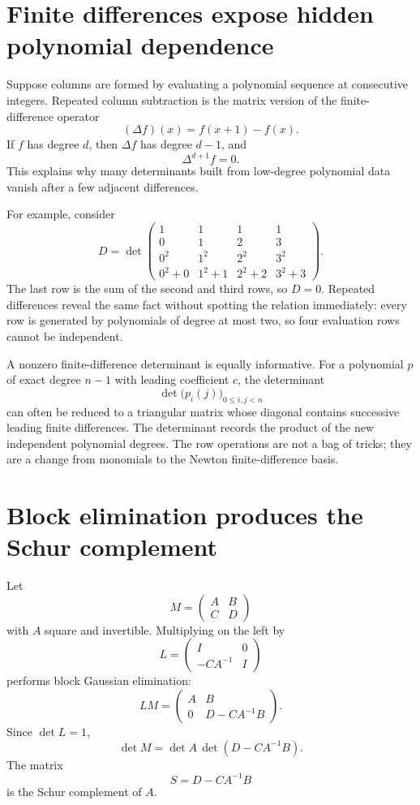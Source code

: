\section{Finite differences expose hidden polynomial dependence}

Suppose columns are formed by evaluating a polynomial sequence at consecutive integers.  Repeated column subtraction is the matrix version of the finite-difference operator
\[
  (\Delta f)(x)=f(x+1)-f(x).
\]
If \(f\) has degree \(d\), then \(\Delta f\) has degree \(d-1\), and
\[
  \Delta^{d+1}f=0.
\]
This explains why many determinants built from low-degree polynomial data vanish after a few adjacent differences.

For example, consider
\[
  D=
  \det
  \begin{pmatrix}
    1&1&1&1\\
    0&1&2&3\\
    0^2&1^2&2^2&3^2\\
    0^2+0&1^2+1&2^2+2&3^2+3
  \end{pmatrix}.
\]
The last row is the sum of the second and third rows, so \(D=0\).  Repeated differences reveal the same fact without spotting the relation immediately: every row is generated by polynomials of degree at most two, so four evaluation rows cannot be independent.

A nonzero finite-difference determinant is equally informative.  For a polynomial \(p\) of exact degree \(n-1\) with leading coefficient \(c\), the determinant
\[
  \det\bigl(p_i(j)\bigr)_{0\le i,j<n}
\]
can often be reduced to a triangular matrix whose diagonal contains successive leading finite differences.  The determinant records the product of the new independent polynomial degrees.  The row operations are not a bag of tricks; they are a change from monomials to the Newton finite-difference basis.

\section{Block elimination produces the Schur complement}

Let
\[
  M=
  \begin{pmatrix}
    A&B\\
    C&D
  \end{pmatrix}
\]
with \(A\) square and invertible.  Multiplying on the left by
\[
  L=
  \begin{pmatrix}
    I&0\\
    -CA^{-1}&I
  \end{pmatrix}
\]
performs block Gaussian elimination:
\[
  LM=
  \begin{pmatrix}
    A&B\\
    0&D-CA^{-1}B
  \end{pmatrix}.
\]
Since \(\det L=1\),
\[
  \boxed{
  \det M
  =\det A\,\det(D-CA^{-1}B).}
\]
The matrix
\[
  S=D-CA^{-1}B
\]
is the Schur complement of \(A\).

